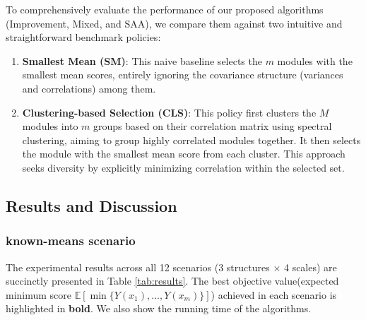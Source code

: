 \documentclass[opre,sglanonrev]{informs4}
\begin{document}
To comprehensively evaluate the performance of our proposed algorithms (Improvement, Mixed, and SAA), we compare them against two intuitive and straightforward benchmark policies:

\begin{enumerate}
    \item \textbf{Smallest Mean (SM)}: This naive baseline selects the $m$ modules with the smallest mean scores, entirely ignoring the covariance structure (variances and correlations) among them.
    \item \textbf{Clustering-based Selection (CLS)}: This policy first clusters the $M$ modules into $m$ groups based on their correlation matrix using spectral clustering, aiming to group highly correlated modules together. It then selects the module with the smallest mean score from each cluster. This approach seeks diversity by explicitly minimizing correlation within the selected set.
\end{enumerate}

\subsection{Results and Discussion}
\subsubsection{known-means scenario}

The experimental results across all 12 scenarios (3 structures $\times$ 4 scales) are succinctly presented in Table \ref{tab:results}. The best objective value(expected minimum score $\mathbb{E}[\min\{Y(x_1), ..., Y(x_m)\}]$) achieved in each scenario is highlighted in \textbf{bold}. We also show the running time of the algorithms. 
\end{document}
